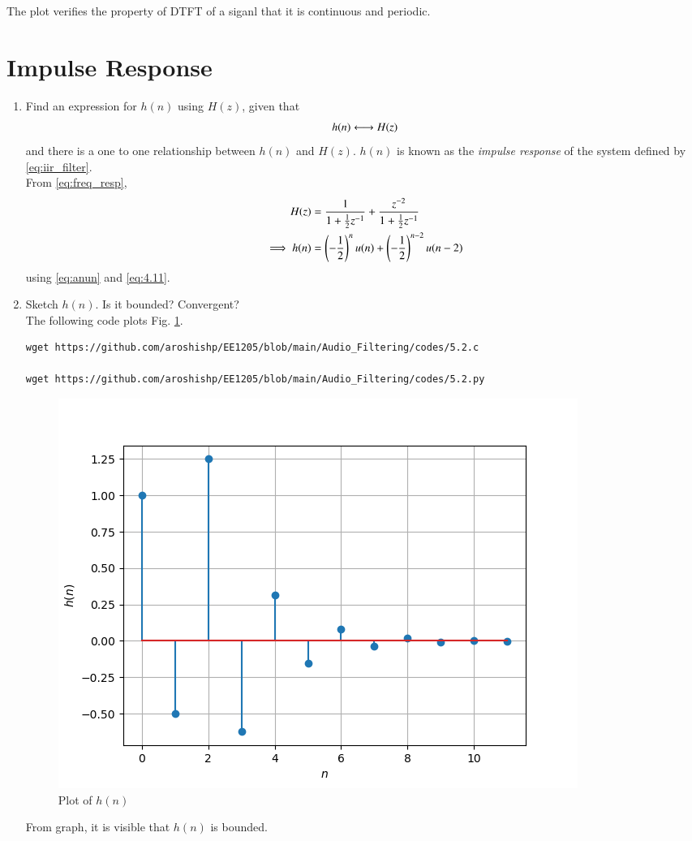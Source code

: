 \documentclass[journal,12pt,twocolumn]{IEEEtran}
\theoremstyle{remark}
\renewcommand\thesection{\arabic{section}}
\numberwithin{equation}{subsection}
\begin{document}
\begin{enumerate}[label=\thesection.\arabic*]
The plot verifies the property of DTFT of a siganl that it is continuous and periodic.
\end{enumerate}

\section{Impulse Response}
\begin{enumerate}[label=\thesection.\arabic*]
\item \label{prob:impulse_resp}
Find an expression for $h(n)$ using $H(z)$, given that 
\begin{equation}
\label{eq:impulse_resp}
h(n) \system H(z)
\end{equation}
and there is a one to one relationship between $h(n)$ and $H(z)$. $h(n)$ is known as the {\em impulse response} of the
system defined by \eqref{eq:iir_filter}.
\\
\solution From \eqref{eq:freq_resp},
\begin{align}
H(z) &= \frac{1}{1 + \frac{1}{2}z^{-1}} + \frac{ z^{-2}}{1 + \frac{1}{2}z^{-1}}
\\
\implies h(n) &= \left(-\frac{1}{2}\right)^{n}u(n) + \left(-\frac{1}{2}\right)^{n-2}u(n-2)
\end{align}
using \eqref{eq:anun} and \eqref{eq:4.11}.
\item Sketch $h(n)$. Is it bounded? Convergent? 
\\
\solution The following code plots Fig. \ref{fig:hn}.
\begin{lstlisting}
wget https://github.com/aroshishp/EE1205/blob/main/Audio_Filtering/codes/5.2.c

wget https://github.com/aroshishp/EE1205/blob/main/Audio_Filtering/codes/5.2.py
\end{lstlisting}
\begin{figure}[!ht]
\centering
\includegraphics[width=\columnwidth]{figs/5.2.png}
\caption{Plot of $h(n)$}
\label{fig:hn}
\end{figure}
From graph, it is visible that $h(n)$ is bounded.


\end{enumerate}
\end{document}
